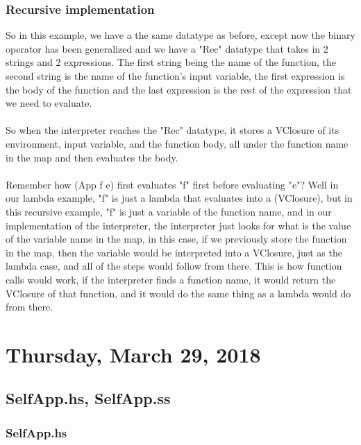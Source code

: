 \documentclass[12pt]{article}
\begin{document}
\subsubsection{Recursive implementation}

So in this example, we have a the same datatype as before, except now the binary operator has been generalized and we have a "Rec" datatype that takes in 2 strings and 2 expressions. The first string being the name of the function, the second string is the name of the function's input variable, the first expression is the body of the function and the last expression is the rest of the expression that we need to evaluate.\\
\\
So when the interpreter reaches the "Rec" datatype, it stores a VClosure of its environment, input variable, and the function body, all under the function name in the map and then evaluates the body.\\
\\
Remember how (App f e) first evaluates "f" first before evaluating "e"? Well in our lambda example, "f" is just a lambda that evaluates into a (VClosure), but in this recursive example, "f" is just a variable of the function name, and in our implementation of the interpreter, the interpreter just looks for what is the value of the variable name in the map, in this case, if we previously store the function in the map, then the variable would be interpreted into a VClosure, just as the lambda case, and all of the steps would follow from there. This is how function calls would work, if the interpreter finds a function name, it would return the VClosure of that function, and it would do the same thing as a lambda would do from there.

\section{Thursday, March 29, 2018}

\subsection{SelfApp.hs, SelfApp.ss}

\subsubsection{SelfApp.hs}
\end{document}
